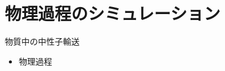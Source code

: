 \section{物理過程のシミュレーション}

\begin{frame}[t,fragile]{物質中の中性子輸送}
  \begin{itemize}
    \setlength{\itemsep}{1em}
  \item 物理過程
  \end{itemize}
\end{frame}
